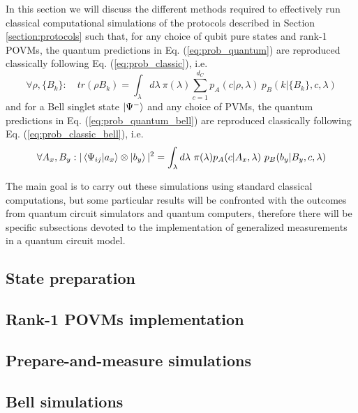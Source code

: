 In this section we will discuss the different methods required to effectively run classical computational simulations of the protocols described in Section \ref{section:protocols} such that, for any choice of qubit pure states and rank-1 POVMs, the quantum predictions in Eq. (\ref{eq:prob_quantum}) are reproduced classically following Eq. (\ref{eq:prob_classic}), i.e.
\begin{equation}
\forall \rho, \{B_{k}\}:\quad tr(\rho B_{k}) = \int_{\lambda} d\lambda\ \pi(\lambda) \sum_{c=1}^{d_C} p_A(c|\rho, \lambda)\ p_B(k|\{B_{k}\}, c, \lambda)    
\end{equation}
and for a Bell singlet state $\ket{\Psi^{-}}$ and any choice of PVMs, the quantum predictions in Eq. (\ref{eq:prob_quantum_bell}) are reproduced classically following Eq. (\ref{eq:prob_classic_bell}), i.e.
\begin{equation}
\forall A_{x}, B_{y}: |\bra{\Psi_{ij}}\ket{a_{x}} \otimes \ket{b_{y}}|^{2} = \int_{\lambda} d\lambda\ \pi(\lambda) p_A(c|A_{x}, \lambda)\ p_B(b_{y}|B_{y}, c, \lambda)
\end{equation}


The main goal is to carry out these simulations using standard classical computations, but some particular results will be confronted with the outcomes from quantum circuit simulators and quantum computers, therefore there will be specific subsections devoted to the implementation of generalized measurements in a quantum circuit model. 
\subsection{State preparation}

\subsection{Rank-1 POVMs implementation}

\subsection{Prepare-and-measure simulations}

\subsection{Bell simulations}
